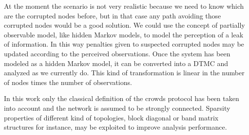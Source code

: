 \documentclass[a4paper, 11pt]{article}
\theoremstyle{definition}
\theoremstyle{remark}
\begin{document}
At the moment the scenario is not very realistic because we need to know which are the corrupted nodes before, but in that case any path avoiding those corrupted nodes would be a good solution. We could use the concept of partially observable model, like hidden Markov models, to model the perception of a leak of information. In this way penalties given to suspected corrupted nodes may be updated according to the perceived observations. Once the system has been modeled as a hidden Markov model, it can be converted into a DTMC and analyzed as we currently do. This kind of transformation is linear in the number of nodes times the number of observations.

In this work only the classical definition of the crowds protocol has been taken into account and the network is assumed to be strongly connected. Sparsity properties of different kind of topologies, block diagonal or band matrix structures for instance, may be exploited to improve analysis performance.



\end{document}

